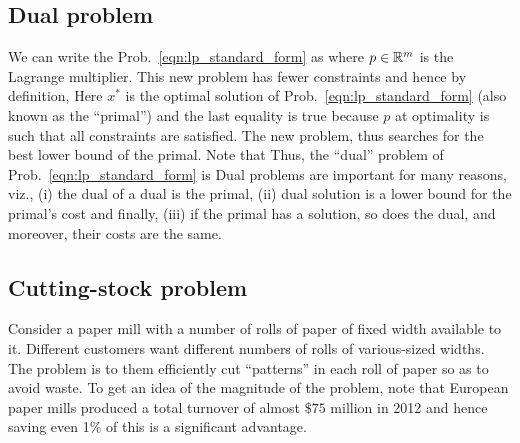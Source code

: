 \documentclass[letterpaper, 10pt, twocolumn, reqno]{amsart}
\begin{document}
\subsection{Dual problem}
\label{ssec:dual}

We can write the Prob.~\eqref{eqn:lp_standard_form} as
where $p \in \mathbb{R}^m$ is the Lagrange multiplier. This new problem has fewer constraints and hence by definition,
Here $x^*$ is the optimal solution of Prob.~\eqref{eqn:lp_standard_form} (also known as the ``primal'') and the last equality is true because $p$ at optimality is such that all constraints are satisfied. The new problem,
thus searches for the best lower bound of the primal. Note that
Thus, the ``dual'' problem of Prob.~\eqref{eqn:lp_standard_form} is
Dual problems are important for many reasons, viz., (i) the dual of a dual is the primal, (ii) dual solution is a lower bound for the primal's cost and finally, (iii) if the primal has a solution, so does the dual, and moreover, their costs are the same.

\subsection{Cutting-stock problem}
\label{ssec:col_gen_cutting_stock}

Consider a paper mill with a number of rolls of paper of fixed width available to it. Different customers want different numbers of rolls of various-sized widths. The problem is to them efficiently cut ``patterns'' in each roll of paper so as to avoid waste. To get an idea of the magnitude of the problem, note that European paper mills produced a total turnover of almost $\$ 75$ million in 2012 and hence saving even 1\% of this is a significant advantage.
\end{document}
